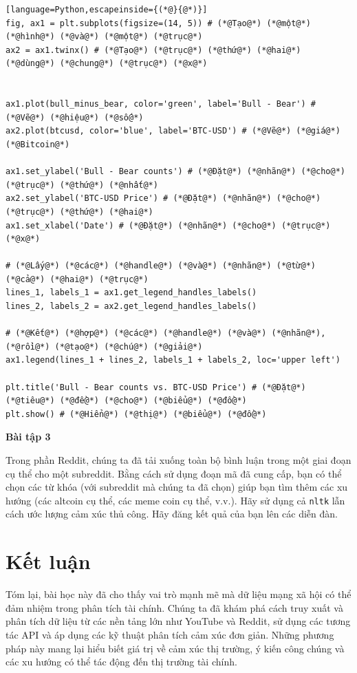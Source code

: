 \begin{lstlisting}[language=Python,escapeinside={(*@}{@*)}]
fig, ax1 = plt.subplots(figsize=(14, 5)) # (*@Tạo@*) (*@một@*) (*@hình@*) (*@và@*) (*@một@*) (*@trục@*)
ax2 = ax1.twinx() # (*@Tạo@*) (*@trục@*) (*@thứ@*) (*@hai@*) (*@dùng@*) (*@chung@*) (*@trục@*) (*@x@*)


ax1.plot(bull_minus_bear, color='green', label='Bull - Bear') # (*@Vẽ@*) (*@hiệu@*) (*@số@*)
ax2.plot(btcusd, color='blue', label='BTC-USD') # (*@Vẽ@*) (*@giá@*) (*@Bitcoin@*)

ax1.set_ylabel('Bull - Bear counts') # (*@Đặt@*) (*@nhãn@*) (*@cho@*) (*@trục@*) (*@thứ@*) (*@nhất@*)
ax2.set_ylabel('BTC-USD Price') # (*@Đặt@*) (*@nhãn@*) (*@cho@*) (*@trục@*) (*@thứ@*) (*@hai@*)
ax1.set_xlabel('Date') # (*@Đặt@*) (*@nhãn@*) (*@cho@*) (*@trục@*) (*@x@*)

# (*@Lấy@*) (*@các@*) (*@handle@*) (*@và@*) (*@nhãn@*) (*@từ@*) (*@cả@*) (*@hai@*) (*@trục@*)
lines_1, labels_1 = ax1.get_legend_handles_labels()
lines_2, labels_2 = ax2.get_legend_handles_labels()

# (*@Kết@*) (*@hợp@*) (*@các@*) (*@handle@*) (*@và@*) (*@nhãn@*), (*@rồi@*) (*@tạo@*) (*@chú@*) (*@giải@*)
ax1.legend(lines_1 + lines_2, labels_1 + labels_2, loc='upper left')

plt.title('Bull - Bear counts vs. BTC-USD Price') # (*@Đặt@*) (*@tiêu@*) (*@đề@*) (*@cho@*) (*@biểu@*) (*@đồ@*)
plt.show() # (*@Hiển@*) (*@thị@*) (*@biểu@*) (*@đồ@*)
\end{lstlisting}

\textbf{Bài tập 3}

Trong phần Reddit, chúng ta đã tải xuống toàn bộ bình luận trong một giai đoạn cụ thể cho một subreddit. Bằng cách sử dụng đoạn mã đã cung cấp, bạn có thể chọn các từ khóa (với subreddit mà chúng ta đã chọn) giúp bạn tìm thêm các xu hướng (các altcoin cụ thể, các meme coin cụ thể, v.v.). Hãy sử dụng cả \texttt{nltk} lẫn cách ước lượng cảm xúc thủ công. Hãy đăng kết quả của bạn lên các diễn đàn.

\section{Kết luận}

Tóm lại, bài học này đã cho thấy vai trò mạnh mẽ mà dữ liệu mạng xã hội có thể đảm nhiệm trong phân tích tài chính. Chúng ta đã khám phá cách truy xuất và phân tích dữ liệu từ các nền tảng lớn như YouTube và Reddit, sử dụng các tương tác API và áp dụng các kỹ thuật phân tích cảm xúc đơn giản. Những phương pháp này mang lại hiểu biết giá trị về cảm xúc thị trường, ý kiến công chúng và các xu hướng có thể tác động đến thị trường tài chính.

